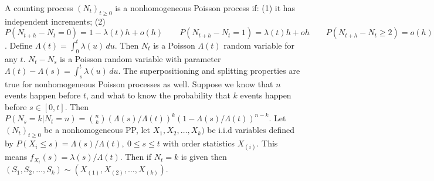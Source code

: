  A counting process $(N_t)_{t \ge 0}$ is a nonhomogeneous Poisson process if:
(1) it has independent increments;
(2) $P(N_{t+h} - N_t = 0) = 1 - \lambda(t)h +o(h) \qquad P(N_{t+h} - N_t = 1) = \lambda(t)h +oh \qquad P(N_{t+h} - N_t \ge 2) = o(h)$.
 Define 
$\Lambda(t) = \int^t_0 \lambda(u)\, du.$ 
Then $N_t$ is a Poisson $\Lambda(t)$ random variable for any $t$.
 $N_t - N_s$ is a Poisson random variable with parameter $\Lambda(t) -\Lambda(s) = \int^{t}_s \lambda(u)\, du.$
 The superpositioning and splitting properties are true for nonhomogeneous Poisson processes as well.
 Suppose we know that $n$ events happen before $t$, and what to know the probability that $k$ events happen before $s \in [0, t]$. Then 
$P(N_s = k| N_t = n) = \binom{n}{k} \left(\Lambda(s)/\Lambda(t) \right)^k (1- \Lambda(s)/\Lambda(t))^{n-k}$.
 Let $(N_t)_{t \ge 0}$ be a nonhomogeneous PP, let $X_1, X_2,\ldots, X_k)$ be i.i.d variables defined by $P(X_i \le s) = \Lambda(s)/\Lambda(t),\ 0 \le s \le t$ with order statistics $X_{(i)}$. This means $f_{X_i}(s) = \lambda(s)/\Lambda(t)$. Then if $N_t = k$ is given then 
$(S_1, S_2, \ldots, S_k) \sim (X_{(1)},X_{(2)},\ldots,X_{(k)})$.